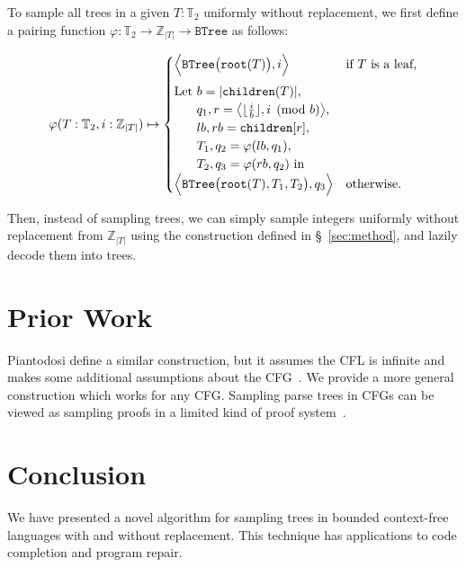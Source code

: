 \documentclass[sigplan,nonacm]{acmart}\settopmatter{printfolios=false,printccs=false,printacmref=false}
\begin{document}
To sample all trees in a given $T: \mathbb{T}_2$ uniformly without replacement, we first define a pairing function $\varphi: \mathbb{T}_2 \rightarrow \mathbb{Z}_{|T|} \rightarrow \texttt{BTree}$ as follows:

\begin{small}
\begin{equation*}
  \varphi(T: \mathbb{T}_2, i: \mathbb{Z}_{|T|}) \mapsto \begin{cases}
  \Big\langle\texttt{BTree}\big(\texttt{root}(T)\big), i\Big\rangle & \text{if $T$ is a leaf,} \vspace{5pt}\\
  \text{Let } b = |\texttt{children}(T)|,\\
  \phantom{\text{Let }} q_1, r=\big\langle\lfloor\frac{i}{b}\rfloor, i \pmod{b}\big\rangle,\\
  \phantom{\text{Let }} lb, rb = \texttt{children}[r],\\
  \phantom{\text{Let }} T_1, q_2 = \varphi(lb, q_1),\\
  \phantom{\text{Let }} T_2, q_3 = \varphi(rb, q_2) \text{ in } \\
  \Big\langle\texttt{BTree}\big(\texttt{root}(T), T_1, T_2\big), q_3\Big\rangle & \text{otherwise.} \\
  \end{cases}
\end{equation*}
\end{small}

Then, instead of sampling trees, we can simply sample integers uniformly without replacement from $\mathbb{Z}_{|T|}$ using the construction defined in \S~\ref{sec:method}, and lazily decode them into trees.

  \section{Prior Work}

  Piantodosi define a similar construction, but it assumes the CFL is infinite and makes some additional assumptions about the CFG~\cite{piantadosi2023enumerate}. We provide a more general construction which works for any CFG. Sampling parse trees in CFGs can be viewed as sampling proofs in a limited kind of proof system~\cite{opedal2023efficient}.

  \section{Conclusion}

  We have presented a novel algorithm for sampling trees in bounded context-free languages with and without replacement. This technique has applications to code completion and program repair.
  
\end{document}
